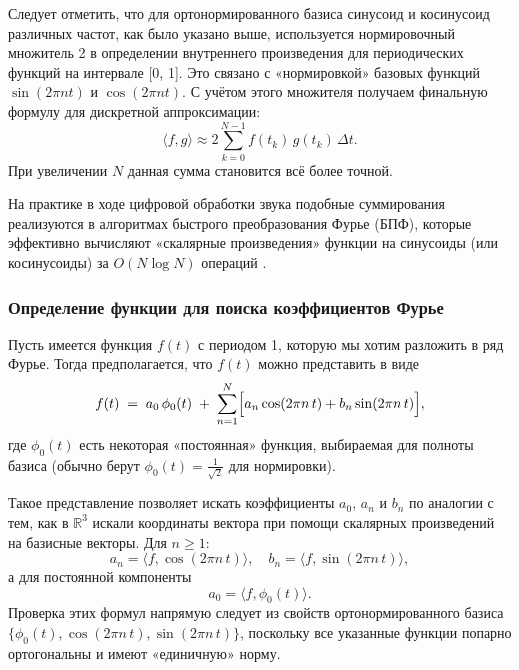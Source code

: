 \documentclass[bachelor, och, diploma]{SCWorks}
\begin{document}
Следует отметить, что для ортонормированного базиса синусоид и косинусоид различных частот, как было указано выше, используется нормировочный множитель 2 в определении внутреннего произведения для периодических функций на интервале [0, 1]. Это связано с «нормировкой» базовых функций \(\sin(2\pi nt)\) и \(\cos(2\pi nt)\). С учётом этого множителя получаем финальную формулу для дискретной аппроксимации:
\[
\langle f, g\rangle \approx 2\sum_{k=0}^{N-1} f(t_k)\,g(t_k)\,\Delta t.
\]
При увеличении \(N\) данная сумма становится всё более точной.


На практике в ходе цифровой обработки звука подобные суммирования реализуются в алгоритмах быстрого преобразования Фурье (БПФ), которые эффективно вычисляют «скалярные произведения» функции на синусоиды (или косинусоиды) за \(O(N \log N)\) операций \cite{opp-sigsys}.

\subsubsection{Определение функции для поиска коэффициентов Фурье}

Пусть имеется функция \(f(t)\) с периодом 1, которую мы хотим разложить в ряд Фурье. Тогда предполагается, что \(f(t)\) можно представить в виде
\[
f(t) \;=\; 
a_0 \,\phi_{0}(t)
\;+\;
\sum_{n=1}^{N} \Bigl[a_n \cos(2\pi n\,t) + b_n \sin(2\pi n\,t)\Bigr],
\]
где \(\phi_0(t)\) есть некоторая «постоянная» функция, выбираемая для полноты базиса (обычно берут \(\phi_0(t) = \tfrac{1}{\sqrt{2}}\) для нормировки).

Такое представление позволяет искать коэффициенты \(a_0\), \(a_n\) и \(b_n\) по аналогии с тем, как в \(\mathbb{R}^3\) искали координаты вектора при помощи скалярных произведений на базисные векторы. Для \(n \ge 1\):
\[
a_n = \langle f, \cos(2\pi n\,t)\rangle,
\quad
b_n = \langle f, \sin(2\pi n\,t)\rangle,
\]
а для постоянной компоненты
\[
a_0 = \langle f, \phi_0(t)\rangle.
\]
Проверка этих формул напрямую следует из свойств ортонормированного базиса \(\{\phi_0(t), \cos(2\pi n\,t), \sin(2\pi n\,t)\}\), поскольку все указанные функции попарно ортогональны и имеют «единичную» норму.
\end{document}

